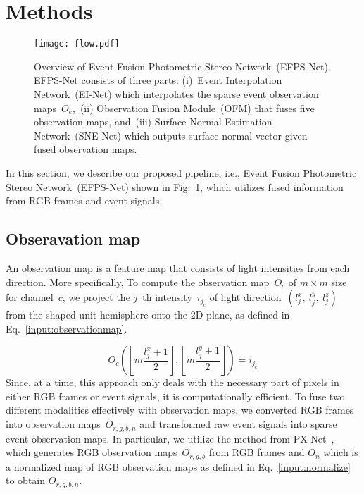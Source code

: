 \documentclass[preprint,12pt,authoryear]{elsarticle}
\begin{document}
\section{Methods}
\begin{figure}[t]
    \centering
    \texttt{[image: flow.pdf]}
    \caption{Overview of Event Fusion Photometric Stereo Network~(EFPS-Net). EFPS-Net consists of three parts: (i)~Event Interpolation Network~(EI-Net) which interpolates the sparse event observation maps~$O_{e}$,~(ii) Observation Fusion Module~(OFM) that fuses five observation maps, and~(iii) Surface Normal Estimation Network~(SNE-Net) which outputs surface normal vector given fused observation maps.}
    \label{fig:modelarchitecture}
\end{figure}
In this section, we describe our proposed pipeline, i.e., Event Fusion Photometric Stereo Network~(EFPS-Net) shown in Fig.~\ref{fig:modelarchitecture}, which utilizes fused information from RGB frames and event signals.

\subsection{Obseravation map}
An observation map is a feature map that consists of light intensities from each direction.
More specifically, To compute the observation map~$O_{c}$ of ${m\times m}$ size for channel~$c$, we project the $j$~th intensity~$i_{j_{c}}$ of light direction~$(l^{x}_{j},~l^{y}_{j},~l^{z}_{j})$ from the shaped unit hemisphere onto the 2D plane, as defined in Eq.~\ref{input:observationmap}.

\begin{equation}
O_{c}\left( \left \lfloor m\frac{l^{x}_{j}+1}{2}\right \rfloor,\left \lfloor m\frac{l^{y}_{j}+1}{2}\right \rfloor \right) = i_{j_{c}}
\label{input:observationmap}
\end{equation}
Since, at a time, this approach only deals with the necessary part of pixels in either RGB frames or event signals, it is computationally efficient. To fuse two different modalities effectively with observation maps, we converted RGB frames into observation maps~$O_{r,g,b,n}$ and transformed raw event signals into sparse event observation maps.  
In particular, we utilize the method from PX-Net~\citep{logothetis2021px}, which generates RGB observation maps~$O_{r,g,b}$ from RGB frames and $O_{n}$ which is a normalized map of RGB observation maps as defined in Eq.~\ref{input:normalize} to obtain $O_{r,g,b,n}$.
\end{document}
